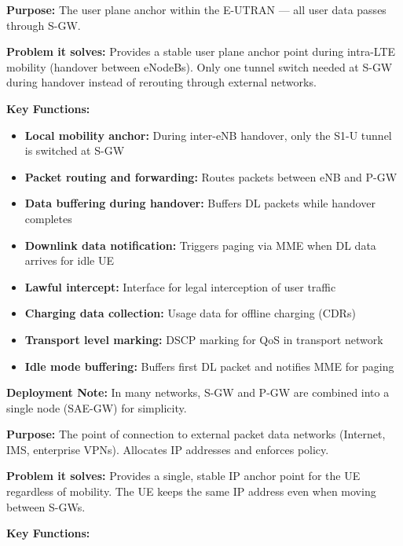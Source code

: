 
\textbf{Purpose:} The user plane anchor within the E-UTRAN — all user data passes through S-GW.

\textbf{Problem it solves:} Provides a stable user plane anchor point during intra-LTE mobility (handover between eNodeBs). Only one tunnel switch needed at S-GW during handover instead of rerouting through external networks.

\textbf{Key Functions:}

\begin{itemize}
\tightlist
\item
  \textbf{Local mobility anchor:} During inter-eNB handover, only the S1-U tunnel is switched at S-GW
\item
  \textbf{Packet routing and forwarding:} Routes packets between eNB and P-GW
\item
  \textbf{Data buffering during handover:} Buffers DL packets while handover completes
\item
  \textbf{Downlink data notification:} Triggers paging via MME when DL data arrives for idle UE
\item
  \textbf{Lawful intercept:} Interface for legal interception of user traffic
\item
  \textbf{Charging data collection:} Usage data for offline charging (CDRs)
\item
  \textbf{Transport level marking:} DSCP marking for QoS in transport network
\item
  \textbf{Idle mode buffering:} Buffers first DL packet and notifies MME for paging
\end{itemize}

\textbf{Deployment Note:} In many networks, S-GW and P-GW are combined into a single node (SAE-GW) for simplicity.


\textbf{Purpose:} The point of connection to external packet data networks (Internet, IMS, enterprise VPNs). Allocates IP addresses and enforces policy.

\textbf{Problem it solves:} Provides a single, stable IP anchor point for the UE regardless of mobility. The UE keeps the same IP address even when moving between S-GWs.

\textbf{Key Functions:}

